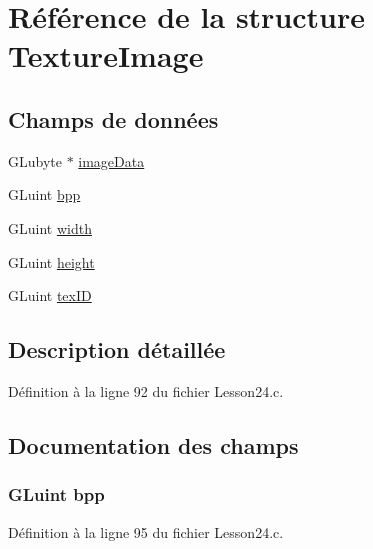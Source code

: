 \hypertarget{struct_texture_image}{}\section{Référence de la structure Texture\+Image}
\label{struct_texture_image}
\subsection*{Champs de données}
\begin{DoxyCompactItemize}
\item 
G\+Lubyte $\ast$ \hyperlink{struct_texture_image_adbd4691e53fc0f8845c47dcd52ecb9ba}{image\+Data}
\item 
G\+Luint \hyperlink{struct_texture_image_ae70d9f0ff3c8630ad78f80064220e78a}{bpp}
\item 
G\+Luint \hyperlink{struct_texture_image_a371e2e2e152ab2d20d47f9868118e0e7}{width}
\item 
G\+Luint \hyperlink{struct_texture_image_aa9d50b6eccecd7c670e4f28f896b39fc}{height}
\item 
G\+Luint \hyperlink{struct_texture_image_ae92e5daff8bbce49af292026f95dc382}{tex\+I\+D}
\end{DoxyCompactItemize}


\subsection{Description détaillée}


Définition à la ligne 92 du fichier Lesson24.\+c.



\subsection{Documentation des champs}
\hypertarget{struct_texture_image_ae70d9f0ff3c8630ad78f80064220e78a}{}
\subsubsection[{bpp}]{\setlength{\rightskip}{0pt plus 5cm}G\+Luint bpp}\label{struct_texture_image_ae70d9f0ff3c8630ad78f80064220e78a}


Définition à la ligne 95 du fichier Lesson24.\+c.

\hypertarget{struct_texture_image_aa9d50b6eccecd7c670e4f28f896b39fc}{}

